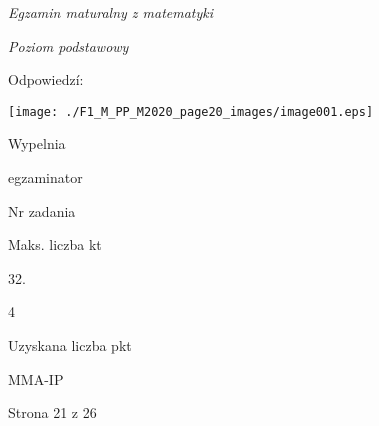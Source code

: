 \documentclass[a4paper,12pt]{article}
\begin{document}
{\it Egzamin maturalny z matematyki}

{\it Poziom podstawowy}

Odpowiedzí:
\begin{center}
\texttt{[image: ./F1\_M\_PP\_M2020\_page20\_images/image001.eps]}
\end{center}
Wypelnia

egzaminator

Nr zadania

Maks. liczba kt

32.

4

Uzyskana liczba pkt

MMA-IP

Strona 21 z 26
\end{document}
